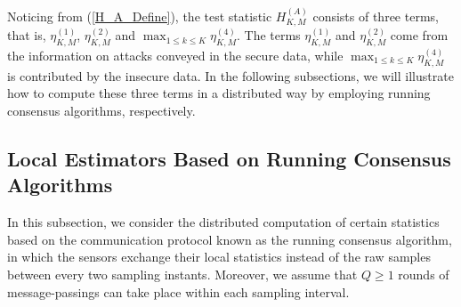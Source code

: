 \documentclass[11pt, draftclsnofoot, onecolumn]{IEEEtran}
\begin{document}
Noticing from (\ref{H_A_Define}), the test statistic $H_{K,M}^{\left( A \right)}$ consists of three terms, that is, ${{\eta} _{K,M}^{(1)}}$, ${{\eta} _{K,M}^{(2)}}$ and $\max_{1 \le k \le K} {{\eta} _{K,M}^{(4)}}$. 
The terms ${{\eta} _{K,M}^{(1)}}$ and ${{\eta} _{K,M}^{(2)}}$ come from the information on attacks conveyed in the secure data, while $\max_{1 \le k \le K} {{\eta} _{K,M}^{(4)}}$ is contributed by the insecure data.
In the following subsections, we will illustrate how to compute these three terms in a distributed way by employing running consensus algorithms, respectively.

\subsection{Local Estimators Based on Running Consensus Algorithms}


In this subsection, we  consider the distributed computation of certain statistics based on the communication protocol known as the running consensus algorithm, in which the sensors exchange their local statistics instead of the raw samples between every two sampling instants. Moreover, we assume that $Q \ge 1$ rounds of message-passings can take place within each sampling interval. 
\end{document}
